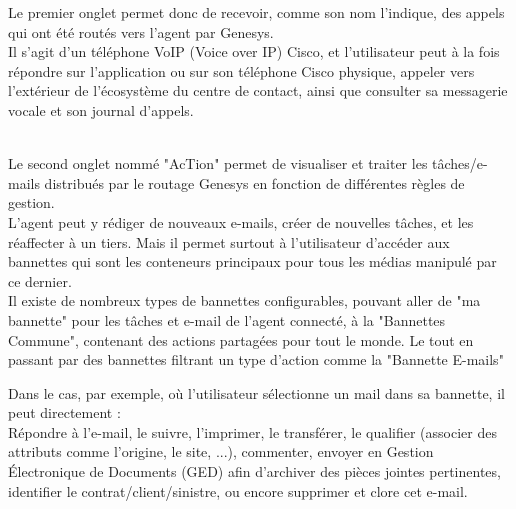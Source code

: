 \documentclass{rapport}
\begin{document}
\vspace{5mm} %
\begin{minipage}{0.65\textwidth}
Le premier onglet permet donc de recevoir, comme son nom l'indique, des appels qui ont été routés vers l'agent par Genesys. \\

Il s'agit d'un téléphone VoIP (Voice over IP) Cisco, et l'utilisateur peut à la fois répondre sur l'application ou sur son téléphone Cisco physique, appeler vers l'extérieur de l'écosystème du centre de contact, ainsi que consulter sa messagerie vocale et son journal d'appels.\\

\end{minipage}
\begin{minipage}{0.25\textwidth}
\end{minipage}
\vspace{5mm} %
\noindent
\\

Le second onglet nommé "AcTion" permet de visualiser et traiter les tâches/e-mails distribués par le routage Genesys en fonction de différentes règles de gestion.\\

L'agent peut y rédiger de nouveaux e-mails, créer de nouvelles tâches, et les réaffecter à un tiers. Mais il permet surtout à l'utilisateur d'accéder aux bannettes qui sont les conteneurs principaux pour tous les médias manipulé par ce dernier. \\
Il existe de nombreux types de bannettes configurables, pouvant aller de "ma bannette" pour les tâches et e-mail de l'agent connecté, à la "Bannettes Commune", contenant des actions partagées pour tout le monde. Le tout en passant par des bannettes filtrant un type d'action comme la "Bannette E-mails"\\



Dans le cas, par exemple, où l'utilisateur sélectionne un mail dans sa bannette, il peut directement :\\
Répondre à l'e-mail, le suivre, l'imprimer, le transférer, le qualifier (associer des attributs comme l'origine, le site, ...), commenter, envoyer en Gestion Électronique de Documents (GED) afin d'archiver des pièces jointes pertinentes, identifier le contrat/client/sinistre, ou encore supprimer et clore cet e-mail.\\
\end{document}
